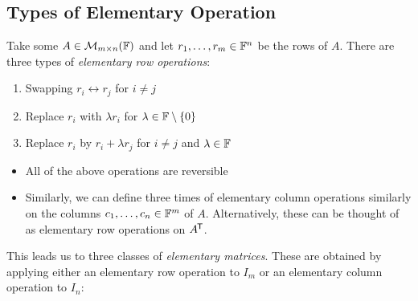 \documentclass[../main.tex]{subfiles}
\begin{document}
\subsection{Types of Elementary Operation} \label{elementaryTypes}
Take some $A \in \mathcal{M}_{m \times n}(\mathbb{F})$ and let $r_1, \ldots, r_m \in \mathbb{F}^n$ be the rows of $A$.
There are three types of \textit{elementary row operations}:
\begin{enumerate}
  \item Swapping $r_i \leftrightarrow r_j$ for $i \neq j$
  \item Replace $r_i$ with $\lambda r_i$ for $\lambda \in \mathbb{F} \setminus \{0\}$
  \item Replace $r_i$ by $r_i + \lambda r_j$ for $i \neq j$ and $\lambda \in \mathbb{F}$
\end{enumerate}
\begin{remark}[Remarks]
  \begin{itemize}
    \item All of the above operations are reversible
    \item Similarly, we can define three times of elementary column operations similarly on the columns $c_1, \ldots, c_n \in \mathbb{F}^m$ of $A$.
      Alternatively, these can be thought of as elementary row operations on $A^{{\mkern-1.5mu\mathsf{T}}}$.
  \end{itemize}
\end{remark}
This leads us to three classes of \textit{elementary matrices}.
These are obtained by applying either an elementary row operation to $I_m$ or an elementary column operation to $I_n$:
\end{document}
